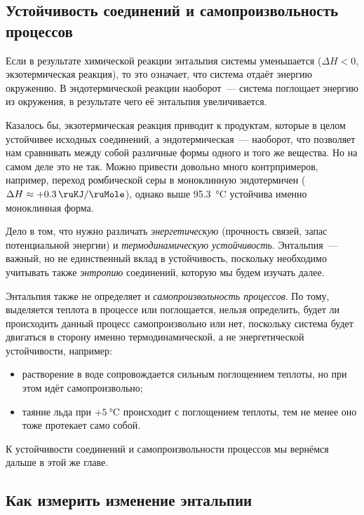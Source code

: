 \subsection*{Устойчивость соединений и самопроизвольность процессов}

Если в результате химической реакции энтальпия системы уменьшается ($\Delta H < 0$, экзотермическая реакция), то это означает, что система отдаёт энергию окружению. В эндотермической реакции наоборот~--- система поглощает энергию из окружения, в результате чего её энтальпия увеличивается.

Казалось бы, экзотермическая реакция приводит к продуктам, которые в целом устойчивее исходных соединений, а эндотермическая~--- наоборот, что позволяет нам сравнивать между собой различные формы одного и того же вещества. Но на самом деле это не так. Можно привести довольно много контрпримеров, например, переход ромбической серы в моноклинную эндотермичен ($\Delta H \approx +\qty{0,3}{\ruKJ\per\ruMole}$), однако выше \qty{95,3}{\degreeCelsius} устойчива именно моноклинная форма.

Дело в том, что нужно различать \emph{энергетическую} (прочность связей, запас потенциальной энергии) и \emph{термодинамическую устойчивость}. Энтальпия~--- важный, но не единственный вклад в устойчивость, поскольку необходимо учитывать также \emph{энтропию} соединений, которую мы будем изучать далее.

Энтальпия также не определяет и \emph{самопроизвольность процессов}. По тому, выделяется теплота в процессе или поглощается, нельзя определить, будет ли происходить данный процесс самопроизвольно или нет, поскольку система будет двигаться в сторону именно термодинамической, а не энергетической устойчивости, например:

\begin{itemize}
    \item растворение  в воде сопровождается сильным поглощением теплоты, но при этом идёт самопроизвольно;
    \item таяние льда при $+\qty{5}{\degreeCelsius}$ происходит с поглощением теплоты, тем не менее оно тоже протекает само собой.
\end{itemize}

К устойчивости соединений и самопроизвольности процессов мы вернёмся дальше в этой же главе.

\subsection*{Как измерить изменение энтальпии}

